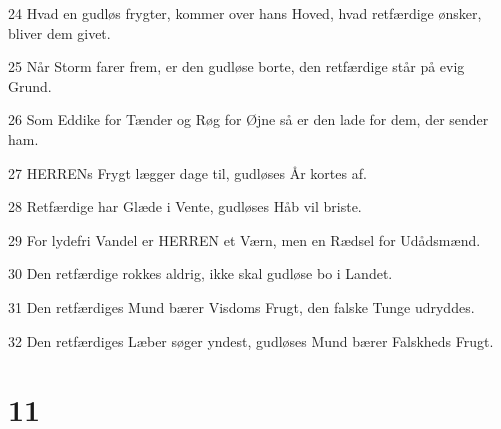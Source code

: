 \par 24 Hvad en gudløs frygter, kommer over hans Hoved, hvad retfærdige ønsker, bliver dem givet.
\par 25 Når Storm farer frem, er den gudløse borte, den retfærdige står på evig Grund.
\par 26 Som Eddike for Tænder og Røg for Øjne så er den lade for dem, der sender ham.
\par 27 HERRENs Frygt lægger dage til, gudløses År kortes af.
\par 28 Retfærdige har Glæde i Vente, gudløses Håb vil briste.
\par 29 For lydefri Vandel er HERREN et Værn, men en Rædsel for Udådsmænd.
\par 30 Den retfærdige rokkes aldrig, ikke skal gudløse bo i Landet.
\par 31 Den retfærdiges Mund bærer Visdoms Frugt, den falske Tunge udryddes.
\par 32 Den retfærdiges Læber søger yndest, gudløses Mund bærer Falskheds Frugt.

\chapter{11}

